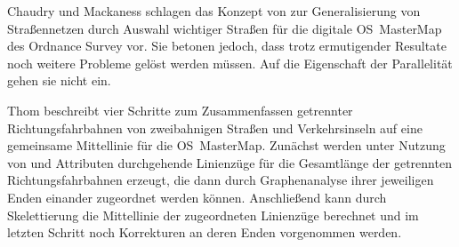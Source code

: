\documentclass[../main/thesis.tex]{subfiles}
\begin{document}

Chaudry und Mackaness schlagen das Konzept von  zur Generalisierung von Straßennetzen durch Auswahl wichtiger Straßen für die digitale OS~MasterMap des Ordnance Survey vor.
Sie betonen jedoch, dass trotz ermutigender Resultate noch weitere Probleme gelöst werden müssen.
Auf die Eigenschaft der Parallelität gehen sie nicht ein. 


\label{os-mastermap}

Thom beschreibt vier Schritte zum Zusammenfassen getrennter Richtungsfahrbahnen von zweibahnigen Straßen und Verkehrsinseln auf eine gemeinsame Mittellinie für die OS~MasterMap.
Zunächst werden unter Nutzung von  und Attributen durchgehende Linienzüge für die Gesamtlänge der getrennten Richtungsfahrbahnen erzeugt, die dann durch Graphenanalyse ihrer jeweiligen Enden einander zugeordnet werden können.
Anschließend kann durch Skelettierung die Mittellinie der zugeordneten Linienzüge berechnet und im letzten Schritt noch Korrekturen an deren Enden vorgenommen werden. 
\end{document}
